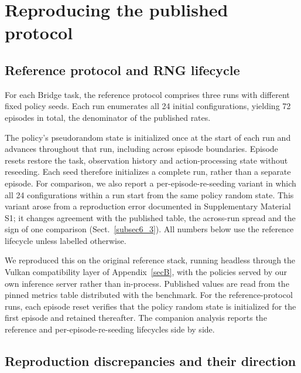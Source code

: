 \documentclass[pdflatex,iicol,sn-apa]{sn-jnl}
\theoremstyle{remark}
\begin{document}
\section{Reproducing the published protocol}\label{sec6}

\subsection{Reference protocol and RNG lifecycle}\label{subsec6_1}

For each Bridge task, the reference protocol comprises three runs with different fixed policy seeds.
Each run enumerates all 24 initial configurations, yielding 72 episodes in total, the denominator
of the published rates.

The policy's pseudorandom state is initialized once at the start of each run and advances
throughout that run, including across episode boundaries. Episode resets restore the task,
observation history and action-processing state without reseeding. Each seed therefore
initializes a complete run, rather than a separate episode.
For comparison, we also report a per-episode-re-seeding variant in which all 24 configurations
within a run start from the same policy random state. This variant arose from a reproduction error
documented in Supplementary Material S1; it changes agreement with the published table, the across-run
spread and the sign of one comparison (Sect.~\ref{subsec6_3}). All numbers below use the reference
lifecycle unless labelled otherwise.

We reproduced this on the original reference stack, running headless through the Vulkan compatibility
layer of Appendix~\ref{secB}, with the policies served by our own inference server rather than
in-process. Published values are read from the pinned metrics table distributed with the benchmark.
For the reference-protocol runs, each episode reset verifies that the policy random state is initialized for the first episode and retained thereafter.
The companion analysis reports the reference and per-episode-re-seeding lifecycles side by side.

\subsection{Reproduction discrepancies and their direction}\label{subsec6_2}
\end{document}
